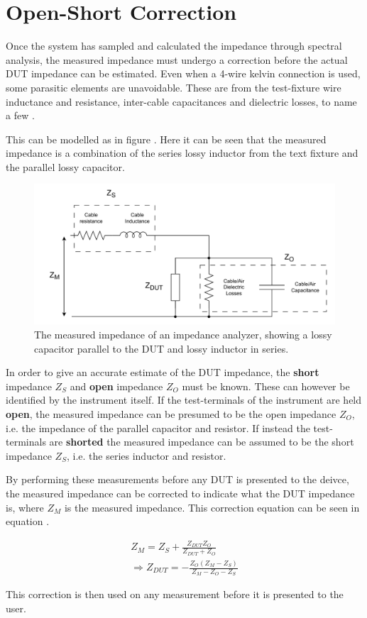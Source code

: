 \section{Open-Short Correction} \label{subsec:OpenShort} 
Once the system has sampled and calculated the impedance through spectral analysis, the measured impedance must undergo a correction before the actual DUT impedance can be estimated. Even when a 4-wire kelvin connection is used, some parasitic elements are unavoidable. These are from the test-fixture wire inductance and resistance, inter-cable capacitances and dielectric losses, to name a few \cite{OpenShort}.

This can be modelled as in figure . Here it can be seen that the measured impedance is a combination of the series lossy inductor from the text fixture and the parallel lossy capacitor. 

\begin{figure}[H]
    \centering
    \includegraphics[clip, trim=0 0 0 0, width=1.0\textwidth]{Sections/7_SystemDesign/Figures/OpenShort.pdf}
    \caption{The measured impedance of an impedance analyzer, showing a lossy capacitor parallel to the DUT and lossy inductor in series.}
    \label{fig_7_3_3_5_OpenShort}
\end{figure}

In order to give an accurate estimate of the DUT impedance, the \textbf{short} impedance $Z_S$ and \textbf{open} impedance $Z_O$ must be known. These can however be identified by the instrument itself. If the test-terminals of the instrument are held \textbf{open}, the measured impedance can be presumed to be the open impedance $Z_O$, i.e. the impedance of the parallel capacitor and resistor. If instead the test-terminals are \textbf{shorted} the measured impedance can be assumed to be the short impedance $Z_S$, i.e. the series inductor and resistor.

By performing these measurements before any DUT is presented to the deivce, the measured impedance can be corrected to indicate what the DUT impedance is, where $Z_M$ is the measured impedance. This correction equation can be seen in equation .

\begin{equation}
\label{eq:OpenShort}
\begin{split}
    Z_M = Z_S + \frac{Z_{DUT}Z_O}{Z_{DUT}+Z_O} \\
    \Rightarrow Z_{DUT} = -\frac{Z_O(Z_M-Z_S)}{Z_M-Z_O-Z_S} 
\end{split}
\end{equation}

This correction is then used on any measurement before it is presented to the user. 